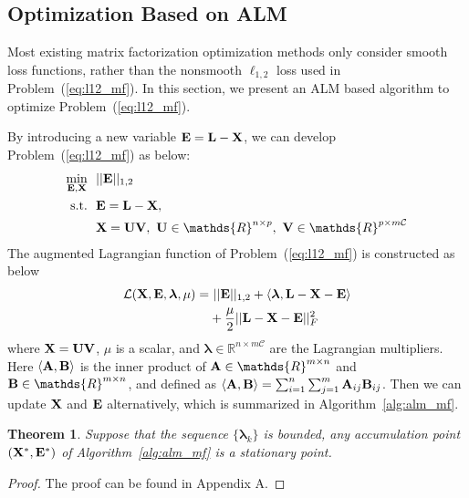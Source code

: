\documentclass[letterpaper]{article}
\newtheorem{theorem}{Theorem}
\def\bA{{\bf A}}
\def\bB{{\bf B}}
\def\bE{{\bf E}}
\def\blambda{{\bm \lambda}}
\def\calL{{\mathcal{L}}}
\def\calC{{\mathcal{C}}}
\def\bL{{\bf L}}
\def\bU{{\bf U}}
\def\bV{{\bf V}}
\def\dsR{\mathds{R}}
\def\bX{{\bf X}}
\def\bA{{\bf A}}
\def\bX{{\bf X}}
\def\st{{\text{s.t.}}}
\begin{document}
\subsection{Optimization Based on ALM}

Most existing matrix factorization optimization methods only consider smooth loss functions, rather than the nonsmooth $\ell_{1,2}$ loss used in Problem~(\ref{eq:l12_mf}).
In this section, we present an ALM based algorithm to optimize Problem~(\ref{eq:l12_mf}).



By introducing a new variable $\bE = \bL - \bX$, we can develop Problem~(\ref{eq:l12_mf}) as below:
\begin{align}\label{eq:mf_l21_constrained}
  \min_{\bE, \bX} ~&~ || \bE ||_{1,2}      \nonumber \\
  \st             ~&~ \bE = \bL - \bX  ,   \nonumber \\
                  ~&~ \bX = \bU \bV,~\bU \in \dsR^{n \times p},~\bV \in \dsR^{p \times m \calC}
\end{align}
The augmented Lagrangian function of Problem~(\ref{eq:l12_mf}) is constructed as below
\begin{align}\label{eq:lagrangian_l21}
  \calL (\bX, \bE, \blambda, \mu) = &~ || \bE ||_{1,2} + \langle \blambda, \bL - \bX - \bE \rangle      \nonumber \\
                                    & + \frac{\mu}{2} || \bL - \bX - \bE ||_F^2
\end{align}
\noindent
where $\bX = \bU \bV$, $\mu$ is a scalar,
and $\blambda \in \dsR^{n \times m\calC}$ are the Lagrangian multipliers.
Here $\langle \bA, \bB \rangle$ is the inner product of $\bA \in \dsR^{m \times n}$ and $\bB \in \dsR^{m \times n}$, and defined as $\langle \bA, \bB \rangle = \sum_{i=1}^{n} \sum_{j=1}^{m} \bA_{ij} \bB_{ij}$.
Then we can update $\bX$ and $\bE$ alternatively, which is summarized in Algorithm~\ref{alg:alm_mf}.




\begin{theorem}
\label{theorem:alm_convergence}
  Suppose that the sequence $\{ \blambda_{k} \}$ is bounded, any accumulation point $(\bX^*, \bE^*)$ of Algorithm~\ref{alg:alm_mf} is a stationary point.
\end{theorem}

\begin{proof}
\label{proof:proof_AA}
  The proof can be found in Appendix A.
\end{proof}
\end{document}
